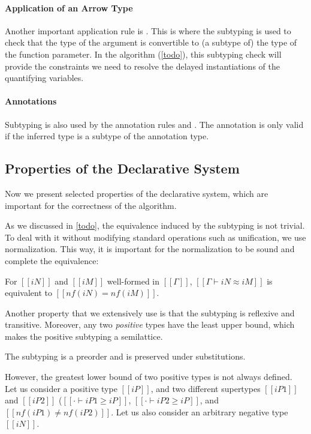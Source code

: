 \paragraph{Application of an Arrow Type}
  Another important application rule is .
  This is where the subtyping is used to check that the type of the argument
  is convertible to (a subtype of) the type of the function parameter.
  In the algorithm (\cref{todo}), this subtyping check will provide the constraints
  we need to resolve the delayed instantiations of the quantifying variables.

\paragraph{Annotations}
  Subtyping is also used by the annotation rules 
  and . The annotation is only valid if the
  inferred type is a subtype of the annotation type.


\subsection{Properties of the Declarative System}

Now we present selected properties of the declarative system,
which are important for the correctness of the algorithm.

As we discussed in \cref{todo}, the equivalence induced by the subtyping is 
not trivial. To deal with it without modifying standard operations such as unification, 
we use normalization. This way, it is important for the normalization to be 
sound and complete \wrt the equivalence:

\begin{property}
  For $[[iN]]$ and $[[iM]]$ well-formed in $[[Γ]]$,
  $[[Γ ⊢ iN ≈ iM]]$ is equivalent to $[[nf(iN) = nf(iM)]]$.
\end{property}

Another property that we extensively use is that the subtyping is reflexive and transitive. 
Moreover, any two \emph{positive} types have the least upper bound, which makes the positive subtyping a semilattice.

\begin{property}
  The subtyping is a preorder and is preserved under substitutions. 
\end{property}

However, the greatest lower bound of two positive types is not always defined.
Let us consider a positive type $[[iP]]$,
and two different supertypes $[[iP1]]$ and $[[iP2]]$
(\ie  $[[· ⊢ iP1 ≥ iP]]$, $[[· ⊢ iP2 ≥ iP]]$, and $[[nf(iP1) ≠ nf(iP2)]]$.
Let us also consider an arbitrary negative type $[[iN]]$.
